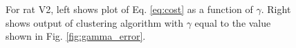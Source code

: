 \documentclass[superscriptaddress, twocolumn, prl]{revtex4}
\begin{document}
\begin{figure}[h]
\centering
{}
\caption{For rat V2, left shows plot of Eq. \ref{eq:cost} as a function of $\gamma$. Right shows output of clustering algorithm with $\gamma$ equal to the value shown in Fig. \ref{fig:gamma_error}.}
\end{figure}
\end{document}
